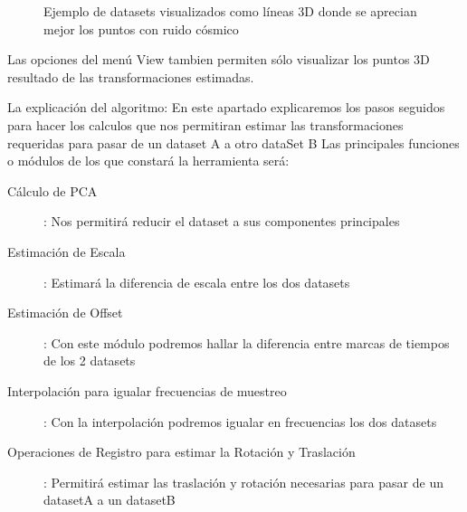\begin{figure}[H]
\begin{center}
\hspace{0.5cm}

\end{center}

\caption{Ejemplo de datasets visualizados como líneas 3D donde se aprecian mejor los puntos con ruido cósmico}
\end{figure}

Las opciones del menú View tambien permiten sólo visualizar los puntos 3D resultado de las transformaciones estimadas.

    
La explicación del algoritmo:
En este apartado explicaremos los pasos seguidos para hacer los calculos que nos permitiran estimar las transformaciones requeridas para pasar de un dataset A a otro dataSet B
Las principales funciones o módulos de los que constará la herramienta será:
\begin{description}
\item [Cálculo de PCA]: Nos permitirá reducir el dataset a  sus componentes principales
\item [Estimación de Escala]: Estimará la diferencia de escala entre los dos datasets
\item [Estimación de Offset]: Con este módulo podremos hallar la diferencia entre marcas de tiempos de los 2 datasets
\item [Interpolación para igualar frecuencias de muestreo]: Con la interpolación podremos igualar en frecuencias los dos datasets
\item [Operaciones de Registro para estimar la Rotación y Traslación]: Permitirá estimar las traslación y rotación necesarias para pasar de un datasetA a un datasetB
\end{description}


